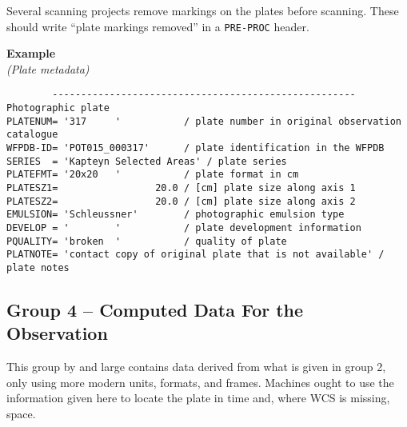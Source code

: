 \documentclass[11pt]{ivoa}
\newcommand\cardname[1]{\texttt{\color{keyword}#1}}
\newenvironment{fitsexample}[1]
{\bigskip\noindent\textbf{Example}\\\textit{(#1)\smallskip}}
{\medskip}
\begin{document}
Several scanning projects remove markings on the plates before
scanning.  These should write ``plate markings removed'' in a
\cardname{PRE-PROC} header.

\begin{fitsexample}{Plate metadata}
\begin{lstlisting}
        ----------------------------------------------------- Photographic plate
PLATENUM= '317     '           / plate number in original observation catalogue
WFPDB-ID= 'POT015_000317'      / plate identification in the WFPDB
SERIES  = 'Kapteyn Selected Areas' / plate series
PLATEFMT= '20x20   '           / plate format in cm
PLATESZ1=                 20.0 / [cm] plate size along axis 1
PLATESZ2=                 20.0 / [cm] plate size along axis 2
EMULSION= 'Schleussner'        / photographic emulsion type
DEVELOP = '        '           / plate development information
PQUALITY= 'broken  '           / quality of plate
PLATNOTE= 'contact copy of original plate that is not available' / plate notes
\end{lstlisting}
\end{fitsexample}

\subsection{Group 4 – Computed Data For the Observation}

This group by and large contains data derived from what is given in
group 2, only using more modern units, formats, and frames.  Machines
ought to use the information given here to locate the plate in time and,
where WCS is missing, space.
\end{document}
